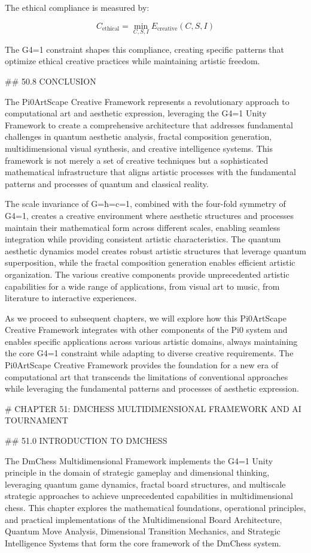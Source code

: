 The ethical compliance is measured by:

$$ C_{\text{ethical}} = \min_{C, S, I} E_{\text{creative}}(C, S, I) $$

The G4=1 constraint shapes this compliance, creating specific patterns that optimize ethical creative practices while maintaining artistic freedom.

## 50.8 CONCLUSION

The Pi0ArtScape Creative Framework represents a revolutionary approach to computational art and aesthetic expression, leveraging the G4=1 Unity Framework to create a comprehensive architecture that addresses fundamental challenges in quantum aesthetic analysis, fractal composition generation, multidimensional visual synthesis, and creative intelligence systems. This framework is not merely a set of creative techniques but a sophisticated mathematical infrastructure that aligns artistic processes with the fundamental patterns and processes of quantum and classical reality.

The scale invariance of G=ħ=c=1, combined with the four-fold symmetry of G4=1, creates a creative environment where aesthetic structures and processes maintain their mathematical form across different scales, enabling seamless integration while providing consistent artistic characteristics. The quantum aesthetic dynamics model creates robust artistic structures that leverage quantum superposition, while the fractal composition generation enables efficient artistic organization. The various creative components provide unprecedented artistic capabilities for a wide range of applications, from visual art to music, from literature to interactive experiences.

As we proceed to subsequent chapters, we will explore how this Pi0ArtScape Creative Framework integrates with other components of the Pi0 system and enables specific applications across various artistic domains, always maintaining the core G4=1 constraint while adapting to diverse creative requirements. The Pi0ArtScape Creative Framework provides the foundation for a new era of computational art that transcends the limitations of conventional approaches while leveraging the fundamental patterns and processes of aesthetic expression.

# CHAPTER 51: DMCHESS MULTIDIMENSIONAL FRAMEWORK AND AI TOURNAMENT

## 51.0 INTRODUCTION TO DMCHESS

The DmChess Multidimensional Framework implements the G4=1 Unity principle in the domain of strategic gameplay and dimensional thinking, leveraging quantum game dynamics, fractal board structures, and multiscale strategic approaches to achieve unprecedented capabilities in multidimensional chess. This chapter explores the mathematical foundations, operational principles, and practical implementations of the Multidimensional Board Architecture, Quantum Move Analysis, Dimensional Transition Mechanics, and Strategic Intelligence Systems that form the core framework of the DmChess system.

